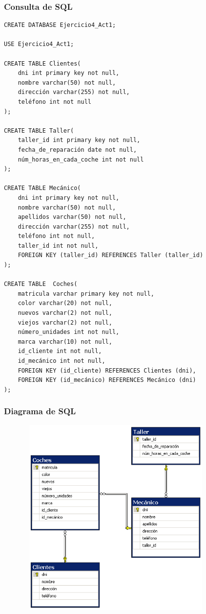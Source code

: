 \documentclass[a4paper, 12pt]{article}
\begin{document}
\begin{justify}
        \subsubsection{Consulta de SQL}
\begin{verbatim}
CREATE DATABASE Ejercicio4_Act1;

USE Ejercicio4_Act1;

CREATE TABLE Clientes(
    dni int primary key not null,
    nombre varchar(50) not null,
    dirección varchar(255) not null,
    teléfono int not null
);

CREATE TABLE Taller(
    taller_id int primary key not null,
    fecha_de_reparación date not null,
    núm_horas_en_cada_coche int not null
);

CREATE TABLE Mecánico(
    dni int primary key not null,
    nombre varchar(50) not null,
    apellidos varchar(50) not null,
    dirección varchar(255) not null,
    teléfono int not null,
    taller_id int not null,
    FOREIGN KEY (taller_id) REFERENCES Taller (taller_id)
);

CREATE TABLE  Coches(
    matricula varchar primary key not null,
    color varchar(20) not null,
    nuevos varchar(2) not null,
    viejos varchar(2) not null,
    número_unidades int not null,
    marca varchar(10) not null,
    id_cliente int not null,
    id_mecánico int not null,
    FOREIGN KEY (id_cliente) REFERENCES Clientes (dni),
    FOREIGN KEY (id_mecánico) REFERENCES Mecánico (dni)
);
\end{verbatim}
        \subsubsection{Diagrama de SQL}
        \begin{figure}[H]
            \centering
            \includegraphics[width=10cm,height=10cm]{sql4.png}
        \end{figure}

\end{justify}
\end{document}

